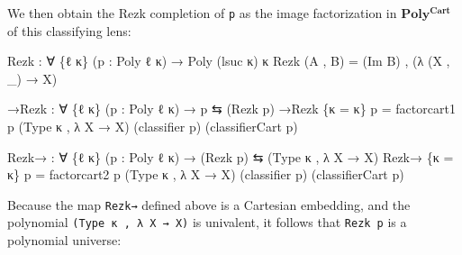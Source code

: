 \documentclass[
  11pt,
  oneside,
  article]{memoir}
\newenvironment{Shaded}{}{}
\newcommand{\NormalTok}[1]{#1}
\newcommand{\OtherTok}[1]{\textcolor[rgb]{0.00,0.44,0.13}{#1}}
\theoremstyle{definition}
\theoremstyle{plain}
\newcommand{\0}{\textsf{0}}
\newcommand{\1}{\tn{\textsf{1}}}
\begin{document}
We then obtain the Rezk completion of \texttt{p} as the image
factorization in \(\mathbf{Poly^{Cart}}\) of this classifying lens:

\begin{Shaded}
\begin{Highlighting}[]
\NormalTok{Rezk }\OtherTok{:} \OtherTok{∀} \OtherTok{\{}\NormalTok{ℓ κ}\OtherTok{\}} \OtherTok{(}\NormalTok{p }\OtherTok{:}\NormalTok{ Poly ℓ κ}\OtherTok{)} \OtherTok{→}\NormalTok{ Poly }\OtherTok{(}\NormalTok{lsuc κ}\OtherTok{)}\NormalTok{ κ}
\NormalTok{Rezk }\OtherTok{(}\NormalTok{A , B}\OtherTok{)} \OtherTok{=} \OtherTok{(}\NormalTok{Im B}\OtherTok{)}\NormalTok{ , }\OtherTok{(λ} \OtherTok{(}\NormalTok{X , }\OtherTok{\_)} \OtherTok{→}\NormalTok{ X}\OtherTok{)}

\NormalTok{→Rezk }\OtherTok{:} \OtherTok{∀} \OtherTok{\{}\NormalTok{ℓ κ}\OtherTok{\}} \OtherTok{(}\NormalTok{p }\OtherTok{:}\NormalTok{ Poly ℓ κ}\OtherTok{)} \OtherTok{→}\NormalTok{ p ⇆ }\OtherTok{(}\NormalTok{Rezk p}\OtherTok{)}
\NormalTok{→Rezk }\OtherTok{\{}\NormalTok{κ }\OtherTok{=}\NormalTok{ κ}\OtherTok{\}}\NormalTok{ p }\OtherTok{=} 
\NormalTok{    factorcart1 p }\OtherTok{(}\NormalTok{Type κ , }\OtherTok{λ}\NormalTok{ X }\OtherTok{→}\NormalTok{ X}\OtherTok{)} 
                  \OtherTok{(}\NormalTok{classifier p}\OtherTok{)} 
                  \OtherTok{(}\NormalTok{classifierCart p}\OtherTok{)}

\NormalTok{Rezk→ }\OtherTok{:} \OtherTok{∀} \OtherTok{\{}\NormalTok{ℓ κ}\OtherTok{\}} \OtherTok{(}\NormalTok{p }\OtherTok{:}\NormalTok{ Poly ℓ κ}\OtherTok{)} \OtherTok{→} \OtherTok{(}\NormalTok{Rezk p}\OtherTok{)}\NormalTok{ ⇆ }\OtherTok{(}\NormalTok{Type κ , }\OtherTok{λ}\NormalTok{ X }\OtherTok{→}\NormalTok{ X}\OtherTok{)}
\NormalTok{Rezk→ }\OtherTok{\{}\NormalTok{κ }\OtherTok{=}\NormalTok{ κ}\OtherTok{\}}\NormalTok{ p }\OtherTok{=}
\NormalTok{    factorcart2 p }\OtherTok{(}\NormalTok{Type κ , }\OtherTok{λ}\NormalTok{ X }\OtherTok{→}\NormalTok{ X}\OtherTok{)} 
                  \OtherTok{(}\NormalTok{classifier p}\OtherTok{)} 
                  \OtherTok{(}\NormalTok{classifierCart p}\OtherTok{)}
\end{Highlighting}
\end{Shaded}

Because the map \texttt{Rezk→} defined above is a Cartesian embedding,
and the polynomial \texttt{(Type\ κ\ ,\ λ\ X\ →\ X)} is univalent, it
follows that \texttt{Rezk\ p} is a polynomial universe:
\end{document}
